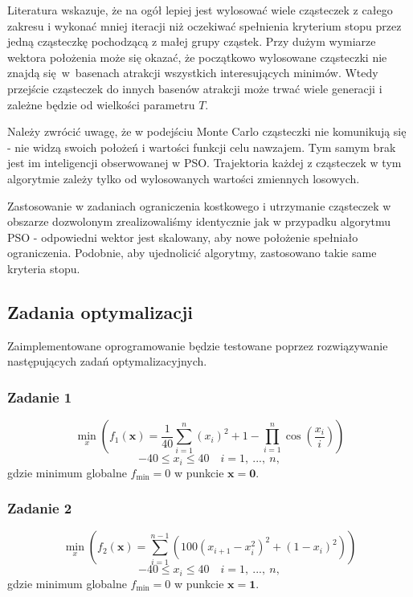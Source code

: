 \documentclass[11pt, a4paper, oneside]{article}
\newcommand{\vect}[1]{\bm{\mathbf{#1}}}
\begin{document}
Literatura wskazuje, że na ogół lepiej jest wylosować wiele cząsteczek z całego zakresu i wykonać mniej iteracji niż oczekiwać spełnienia kryterium stopu przez jedną cząsteczkę pochodzącą z małej grupy cząstek. Przy dużym wymiarze wektora położenia może się okazać, że początkowo wylosowane cząsteczki nie znajdą się~w~basenach atrakcji wszystkich interesujących minimów. Wtedy przejście cząsteczek do innych basenów atrakcji może trwać wiele generacji i zależne będzie od wielkości parametru $T$.

Należy zwrócić uwagę, że w podejściu Monte Carlo cząsteczki nie komunikują się - nie widzą swoich położeń i wartości funkcji celu nawzajem. Tym samym brak jest im inteligencji obserwowanej w PSO. Trajektoria każdej z cząsteczek w tym algorytmie zależy tylko od wylosowanych wartości zmiennych losowych.

Zastosowanie w zadaniach ograniczenia kostkowego i utrzymanie cząsteczek w obszarze dozwolonym zrealizowaliśmy identycznie jak w przypadku algorytmu PSO - odpowiedni wektor jest skalowany, aby nowe położenie spełniało ograniczenia. Podobnie, aby ujednolicić algorytmy, zastosowano takie same kryteria stopu.

\subsection{Zadania optymalizacji}
Zaimplementowane oprogramowanie będzie testowane poprzez rozwiązywanie następujących zadań optymalizacyjnych.
\subsubsection{Zadanie 1}
\begin{equation}
\min_{x} \left(f_{1}\left(\vect{x}\right) = \frac{1}{40} \sum_{i=1}^{n}\left(x_{i}\right)^{2} + 1 - \prod_{i =1}^{n} \cos\left(\frac{x_{i}}{i}\right)\right)
\end{equation}
\begin{equation}
-40 \leq x_{i} \leq 40 \quad i = 1, \ ..., \ n,
\end{equation}
gdzie minimum globalne $f_{\mathrm{min}} = 0$ w punkcie $\vect{x} = \vect{0}$.

\subsubsection{Zadanie 2}
\begin{equation}
\min_{x} \left(f_{2}\left(\vect{x}\right) = \sum_{i=1}^{n-1}\left(100\left(x_{i+1}-x_{i}^{2}\right)^{2} + \left(1-x_{i}\right)^{2} \right) \right)
\end{equation}
\begin{equation}
-40 \leq x_{i} \leq 40 \quad i = 1, \ ..., \ n,
\end{equation}
gdzie minimum globalne $f_{\mathrm{min}} = 0$ w punkcie $\vect{x} = \vect{1}$.
\end{document}
